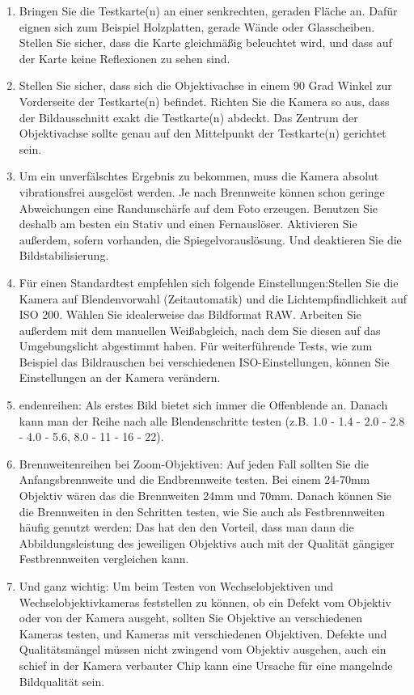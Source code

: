 \begin{enumerate}
  \item Bringen Sie die Testkarte(n) an einer senkrechten, geraden Fläche an. Dafür eignen sich zum Beispiel Holzplatten, gerade Wände oder Glasscheiben. Stellen Sie sicher, dass die Karte gleichmäßig beleuchtet wird, und dass auf der Karte keine Reflexionen zu sehen sind.

  \item Stellen Sie sicher, dass sich die Objektivachse in einem 90 Grad Winkel zur Vorderseite der Testkarte(n) befindet. Richten Sie die Kamera so aus, dass der Bildausschnitt exakt die Testkarte(n) abdeckt. Das Zentrum der Objektivachse sollte genau auf den Mittelpunkt der Testkarte(n) gerichtet sein.

  \item Um ein unverfälschtes Ergebnis zu bekommen, muss die Kamera absolut vibrationsfrei ausgelöst werden. Je nach Brennweite können schon geringe Abweichungen eine Randunschärfe auf dem Foto erzeugen. Benutzen Sie deshalb am besten ein Stativ und einen Fernauslöser. Aktivieren Sie außerdem, sofern vorhanden, die Spiegelvorauslösung. Und deaktieren Sie die Bildstabilisierung.

  \item Für einen Standardtest empfehlen sich folgende Einstellungen:Stellen Sie die Kamera auf Blendenvorwahl (Zeitautomatik) und die Lichtempfindlichkeit auf ISO 200. Wählen Sie idealerweise das Bildformat RAW. Arbeiten Sie außerdem mit dem manuellen Weißabgleich, nach dem Sie diesen auf das Umgebungslicht abgestimmt haben. Für weiterführende Tests, wie zum Beispiel das Bildrauschen bei verschiedenen ISO-Einstellungen, können Sie Einstellungen an der Kamera verändern.

  \item endenreihen: Als erstes Bild bietet sich immer die Offenblende an. Danach kann man der Reihe nach alle Blendenschritte testen (z.B. 1.0 - 1.4 - 2.0 - 2.8 - 4.0 - 5.6, 8.0 - 11 - 16 - 22).

  \item Brennweitenreihen bei Zoom-Objektiven: Auf jeden Fall sollten Sie die Anfangsbrennweite und die Endbrennweite testen. Bei einem 24-70mm Objektiv wären das die Brennweiten 24mm und 70mm. Danach können Sie die Brennweiten in den Schritten testen, wie Sie auch als Festbrennweiten häufig genutzt werden: Das hat den den Vorteil, dass man dann die Abbildungsleistung des jeweiligen Objektivs auch mit der Qualität gängiger Festbrennweiten vergleichen kann.

  \item Und ganz wichtig: Um beim Testen von Wechselobjektiven und Wechselobjektivkameras feststellen zu können, ob ein Defekt vom Objektiv oder von der Kamera ausgeht, sollten Sie Objektive an verschiedenen Kameras testen, und Kameras mit verschiedenen Objektiven. Defekte und Qualitätsmängel müssen nicht zwingend vom Objektiv ausgehen, auch ein schief in der Kamera verbauter Chip kann eine Ursache für eine mangelnde Bildqualität sein.
\end{enumerate}


